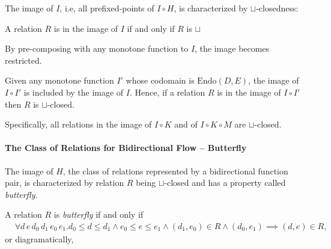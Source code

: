 \documentclass{llncs}
\newcommand{\Endo}{\mathrm{Endo}}
\newcommand{\join}{\sqcup}
\newcommand{\comp}{\circ}
\newcommand{\rotleq}{\rotatebox[origin=c]{90}{$\leq$}}
\begin{document}
  The image of $I$, i.e, all prefixed-points of $I \comp H$, is characterized by $\join$-closedness:
  \begin{theorem}\label{thm:join-closed}
    A relation $R$ is in the image of $I$ if and only if $R$ is $\join$ 
  \end{theorem}


  By pre-composing with any monotone function to $I$, the image becomes restricted.
  \begin{proposition} \label{pr:restriction-subset}
    Given any monotone function $I'$ whose codomain is $\Endo(D, E)$, the image of $I \comp I'$ is included by the image of $I$.
    Hence, if a relation $R$ is in the image of $I \comp I'$ then $R$ is $\join$-closed.
  \end{proposition}
  Specifically, all relations in the image of $I \comp K$ and of $I \comp K \comp M$ are $\join$-closed.

  \paragraph{The Class of Relations for Bidirectional Flow -- Butterfly}
  The image of $H$, the class of relations represented by a bidirectional function pair, is characterized by relation $R$ being $\join$-closed and has a property called \emph{butterfly}.

  \begin{definition}
    A relation $R$ is \emph{butterfly} if and only if \begin{align*}
      &\forall d\, e\, d_{0}\, d_{1 }\, e_{0}\, e_{1} .
      d_{0} \leq d \leq d_{1} \land e_{0} \leq e \leq e_{1} \land (d_{1}, e_{0}) \in R \land (d_{0}, e_{1}) \implies (d, e) \in R,
    \end{align*}or diagramatically, \quad
  \end{definition}
\end{document}
